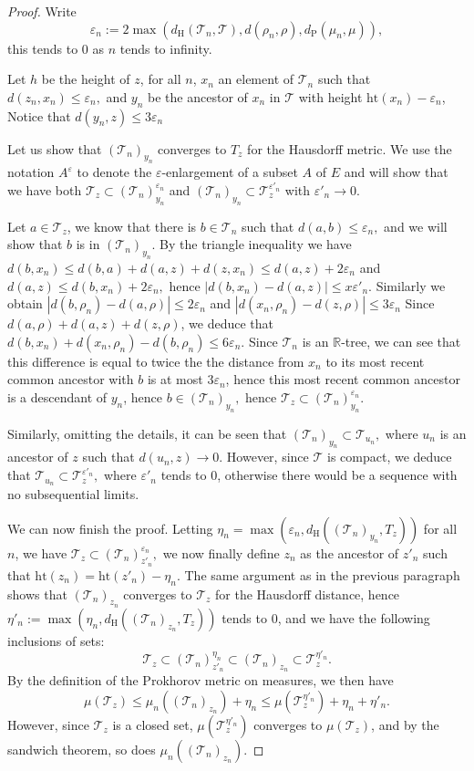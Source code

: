 \documentclass[11pt]{article}
\newcommand{\R}{{\mathbb{R}}}
\newcommand{\T}{\mathcal{T}}
\newcommand{\veps}{\varepsilon}
\renewcommand{\leq}{\leqslant}
\begin{document}
\begin{proof}
Write
\[\veps_n := 2  \max(d_{\mathrm{H}}(\T_n,\T) , d(\rho_n,\rho), d_{\mathrm{P}}(\mu_n,\mu)),\] this tends to $0$ as $n$ tends to infinity.

 Let $h$ be the height of $z$, for all $n$, $x_n$ an element of $\T_n$ such that $d(z_n,x_n)\leq \veps_n,$ and $y_n$ be the ancestor of $x_n$ in $\T$ with height $\mathrm{ht}(x_n)-\veps_n$,  Notice that $d(y_n,z)\leq 3\veps_n$

Let us show that $(\T_n)_{y_n}$ converges to $T_z$ for the Hausdorff metric. We use the notation $A^{\veps}$ to denote the $\veps$-enlargement of a subset $A$ of $E$ and will show that we have both $\T_z\subset (\T_n)_{y_n}^{\veps_n}$ and $(\T_n)_{y_n}\subset \T_z^{\veps'_n}$ with $\veps'_n\to 0.$ 

Let $a\in \T_z$, we know that there is $b\in \T_n$ such that $d(a,b)\leq \veps_n,$ and we will show that $b$ is in $(\T_n)_{y_n}.$ By the triangle inequality we have $d(b,x_n)\leq d(b,a)+d(a,z)+d(z,x_n)\leq d(a,z)+2\veps_n$ and $d(a,z)\leq d(b,x_n)+2\veps_n,$ hence $|d(b,x_n)-d(a,z)|\leq x\veps'_n.$ Similarly we obtain $|d(b,\rho_n)-d(a,\rho)|\leq 2\veps_n$ and $|d(x_n,\rho_n)-d(z,\rho)|\leq 3\veps_n$  Since $d(a,\rho)+d(a,z)+d(z,\rho)$, we deduce that $d(b,x_n)+d(x_n,\rho_n)-d(b,\rho_n)\leq 6\veps_n.$ Since $\T_n$ is an $\R$-tree, we can see that this difference is equal to twice the the distance from $x_n$ to its most recent common ancestor with $b$ is at most $3\veps_n$, hence this most recent common ancestor is a descendant of $y_n$, hence $b\in (\T_n)_{y_n},$ hence $\T_z\subset (\T_n)_{y_n}^{\veps_n}.$

Similarly, omitting the details, it can be seen that $(\T_n)_{y_n}\subset \T_{u_n},$ where $u_n$ is an ancestor of $z$ such that $d(u_n,z)\to 0.$ However, since $\T$ is compact, we deduce that $\T_{u_n}\subset \T_z^{\veps'_n},$ where $\veps'_n$ tends to $0$, otherwise there would be a sequence with no subsequential limits.



We can now finish the proof. Letting $\eta_n=\max(\veps_n,d_{\mathrm{H}}((\T_n)_{y_n},T_z))$ for all $n$, we have $\T_z\subset (\T_n)^{\veps_n}_{z'_n},$ we now finally define $z_n$ as the ancestor of $z'_n$ such that $\mathrm{ht}(z_n)=\mathrm{ht}(z'_n)-\eta_n.$ The same argument as in the previous paragraph shows that $(\T_n)_{z_n}$ converges to $\T_z$ for the Hausdorff distance, hence $\eta'_n:=\max(\eta_n,d_{\mathrm{H}}((\T_n)_{z_n},T_z))$ tends to $0$, and we have the following inclusions of sets:
\[\T_z\subset (\T_n)_{z'_n}^{\eta_n} \subset (\T_n)_{z_n} \subset \T_z^{\eta'_n}.\] By the definition of the Prokhorov metric on measures, we then have
\[\mu(\T_z)\leq \mu_n((\T_n)_{z_n})+\eta_n\leq \mu(\T_z^{\eta'_n})+\eta_n+\eta'_n.\]
However, since $\T_z$ is a closed set, $\mu(\T_z^{\eta'_n})$ converges to $\mu(\T_z)$, and by the sandwich theorem, so does $\mu_n((\T_n)_{z_n})$.
\end{proof}


\end{document}
